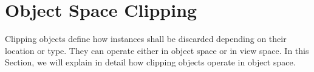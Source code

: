 \section{Object Space Clipping}

Clipping objects define how instances shall be discarded depending on their location or type.
They can operate either in object space or in view space.
In this Section, we will explain in detail how clipping objects operate in object space.


